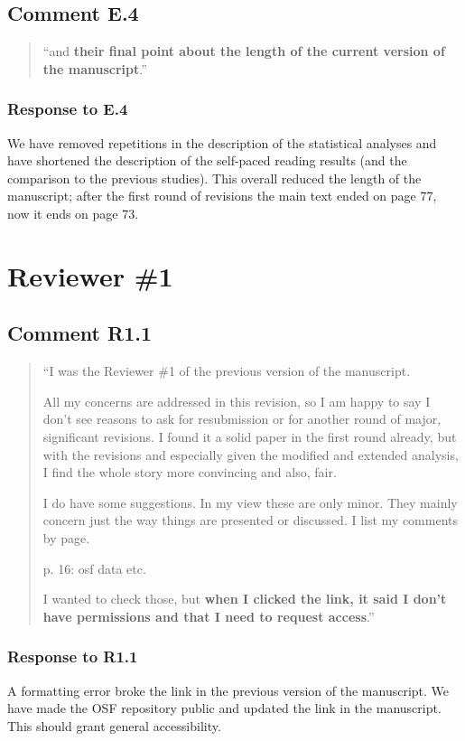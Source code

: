 \documentclass[12pt]{article}
\begin{document}
\subsection*{Comment E.4}
\begin{quote}
``and \textbf{their final point about the length of the current version of the manuscript}.''
\end{quote}

\subsubsection*{Response to E.4}
We have removed repetitions in the description of the statistical analyses and have shortened the description of the self-paced reading results (and the comparison to the previous studies). This overall reduced the length of the manuscript; after the first round of revisions the main text ended on page 77, now it ends on page 73. 

\section*{Reviewer \#1} 

\subsection*{Comment R1.1}
\begin{quote}
``I was the Reviewer \#1 of the previous version of the manuscript.

All my concerns are addressed in this revision, so I am happy to say I don't see reasons to ask for resubmission or for another round of major, significant revisions. I found it a solid paper in the first round already, but with the revisions and especially given the modified and extended analysis, I find the whole story more convincing and also, fair.

I do have some suggestions. In my view these are only minor. They mainly concern just the way things are presented or discussed. I list my comments by page.

p. 16: osf data etc.

I wanted to check those, but \textbf{when I clicked the link, it said I don't have permissions and that I need to request access}.''
\end{quote}

\subsubsection*{Response to R1.1}
A formatting error broke the link in the previous version of the manuscript. We have made the OSF repository public and updated the link in the manuscript. This should grant general accessibility.
\end{document}
